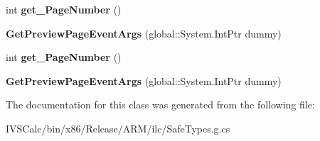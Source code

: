 \begin{DoxyCompactItemize}
int {\bfseries get\+\_\+\+Page\+Number} ()
\item 
\mbox{\label{class_windows_1_1_u_i_1_1_xaml_1_1_printing_1_1_get_preview_page_event_args_a103b7f391562eb9e1ace75e2be8acdc2}} 
{\bfseries Get\+Preview\+Page\+Event\+Args} (global\+::\+System.\+Int\+Ptr dummy)
\item 
\mbox{\label{class_windows_1_1_u_i_1_1_xaml_1_1_printing_1_1_get_preview_page_event_args_a16c523f015a9e0690e4b758e57b51d24}} 
int {\bfseries get\+\_\+\+Page\+Number} ()
\item 
\mbox{\label{class_windows_1_1_u_i_1_1_xaml_1_1_printing_1_1_get_preview_page_event_args_a103b7f391562eb9e1ace75e2be8acdc2}} 
{\bfseries Get\+Preview\+Page\+Event\+Args} (global\+::\+System.\+Int\+Ptr dummy)
\end{DoxyCompactItemize}


The documentation for this class was generated from the following file\+:\begin{DoxyCompactItemize}
\item 
I\+V\+S\+Calc/bin/x86/\+Release/\+A\+R\+M/ilc/Safe\+Types.\+g.\+cs\end{DoxyCompactItemize}
